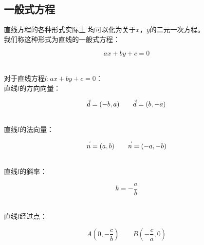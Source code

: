 \documentclass[UTF8]{ctexart}
\let\nvec\vec
\def\vec#1{\nvec{\vphantom b\smash{#1}}}
\begin{document}
\newpage

\subsection{一般式方程}
    直线方程的各种形式实际上
    均可以化为关于$x$，$y$的二元一次方程。\\[3mm]
    我们称这种形式为直线的一般式方程：
    \begin{large}
        \begin{equation*}
            ax+by+c=0
        \end{equation*}
    \end{large}\\
    对于直线方程$l:ax+by+c=0$：\\[6mm]
    直线$l$的方向向量：
    \begin{large}
        \begin{equation*}
            \vec{d}= (-b,a)\qquad\vec{d}=(b,-a)
        \end{equation*}
    \end{large}\\[1mm]
    直线$l$的法向量：
    \begin{large}
        \begin{equation*}
            \vec{n}= (a,b)\qquad\vec{n}=(-a,-b)
        \end{equation*}
    \end{large}\\[1mm]
    直线$l$的斜率：
    \begin{large}
        \begin{equation*}
            k = -\dfrac{a}{b}
        \end{equation*}
    \end{large}\\[1mm]
    直线$l$经过点：
    \begin{large}
        \begin{equation*}
            A(0,-\dfrac{c}{b})\qquad B(-\dfrac{c}{a},0)
        \end{equation*}
    \end{large}

\newpage
\end{document}
